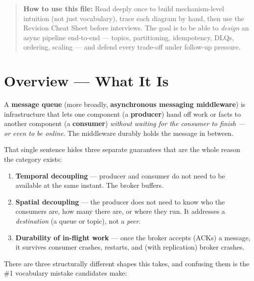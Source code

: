 \documentclass[11pt]{article}
\providecommand{\tightlist}{\setlength{\itemsep}{1pt}\setlength{\parskip}{0pt}}
\begin{document}
\makecoverpage

\thispagestyle{empty}
{\hypersetup{hidelinks}\tableofcontents}
\clearpage

\begin{quote}
\textbf{How to use this file:} Read deeply once to build mechanism-level intuition (not just vocabulary), trace each diagram by hand, then use the Revision Cheat Sheet before interviews. The goal is to be able to \emph{design} an async pipeline end-to-end --- topics, partitioning, idempotency, DLQs, ordering, scaling --- and defend every trade-off under follow-up pressure.
\end{quote}

\section{Overview --- What It Is}\label{overview--what-it-is}

A \textbf{message queue} (more broadly, \textbf{asynchronous messaging middleware}) is infrastructure that lets one component (a \textbf{producer}) hand off work or facts to another component (a \textbf{consumer}) \emph{without waiting for the consumer to finish --- or even to be online}. The middleware durably holds the message in between.

That single sentence hides three separate guarantees that are the whole reason the category exists:

\begin{enumerate}
\def\labelenumi{\arabic{enumi}.}
\tightlist
\item
  \textbf{Temporal decoupling} --- producer and consumer do not need to be available at the same instant. The broker buffers.
\item
  \textbf{Spatial decoupling} --- the producer does not need to know who the consumers are, how many there are, or where they run. It addresses a \emph{destination} (a queue or topic), not a \emph{peer}.
\item
  \textbf{Durability of in-flight work} --- once the broker accepts (ACKs) a message, it survives consumer crashes, restarts, and (with replication) broker crashes.
\end{enumerate}

There are three structurally different shapes this takes, and confusing them is the \#1 vocabulary mistake candidates make:
\end{document}

